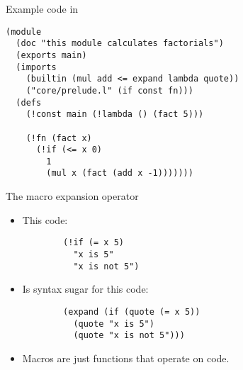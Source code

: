 \begin{frame}[fragile]{Example code in \lang}
\begin{verbatim}
(module
  (doc "this module calculates factorials")
  (exports main)
  (imports
    (builtin (mul add <= expand lambda quote))
    ("core/prelude.l" (if const fn)))
  (defs
    (!const main (!lambda () (fact 5)))

    (!fn (fact x)
      (!if (<= x 0)
        1
        (mul x (fact (add x -1)))))))
\end{verbatim}
\end{frame}

\begin{frame}[fragile]{The macro expansion operator}
\begin{itemize}
    \item This code:
      \begin{verbatim}
        (!if (= x 5)
          "x is 5"
          "x is not 5")
      \end{verbatim}
    \item Is syntax sugar for this code:
      \begin{verbatim}
        (expand (if (quote (= x 5))
          (quote "x is 5")
          (quote "x is not 5")))
      \end{verbatim}
    \item Macros are just functions that operate on code.
\end{itemize}
\end{frame}

